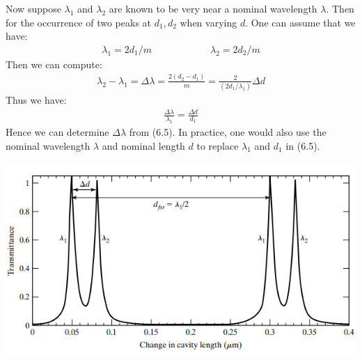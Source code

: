 \documentclass[11pt]{book}
\theoremstyle{break}
\theoremstyle{break}
\begin{document}
Now suppose $\lambda_1$ and $\lambda_2$ are known to be very near a nominal wavelength $\lambda$. Then for the occurrence of two peaks at $d_1,d_2$ when varying $d$. One can assume that we have:
\begin{align*}
\lambda_1 = 2d_1 / m \qquad\qquad\qquad \lambda_2 = 2d_2/m
\end{align*}
Then we can compute:
\begin{align*}
\lambda_2 - \lambda_1 = \Delta \lambda = \frac{2(d_2 - d_1)}{m}=\frac{2}{(2d_1 / \lambda_1)}\Delta d
\end{align*}
Thus we have:
\begin{align}
\frac{\Delta \lambda}{\lambda_1} = \frac{\Delta d}{d_1}
\end{align}
Hence we can determine $\Delta \lambda$ from (6.5). In practice, one would also use the nominal wavelength $\lambda$ and nominal length $d$ to replace $\lambda_1$ and $d_1$ in (6.5). 
\begin{center}
\includegraphics[scale=1]{fsr3.png}
\end{center}
\end{document}
